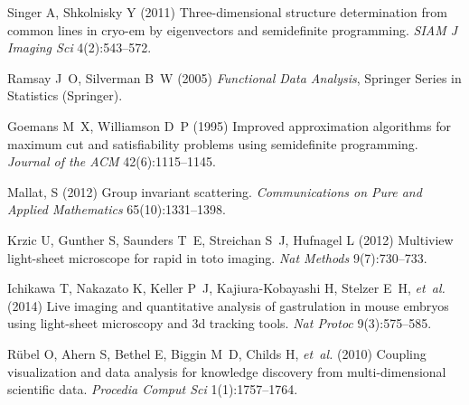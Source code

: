 \documentclass{pnastwo}
\begin{document}
\begin{article}
\begin{thebibliography}{10}
Singer A, Shkolnisky Y (2011) Three-dimensional structure determination from
  common lines in cryo-em by eigenvectors and semidefinite programming.
  \textit{SIAM J Imaging Sci} 4(2):543--572.

Ramsay J~O, Silverman B~W (2005) \textit{Functional Data Analysis}, Springer
  Series in Statistics (Springer).

Goemans M~X, Williamson D~P (1995) Improved approximation algorithms for maximum cut and satisfiability problems using semidefinite programming.
\textit{Journal of the ACM} 42(6):1115--1145.

Mallat, S (2012) Group invariant scattering. 
\textit{Communications on Pure and Applied Mathematics}
65(10):1331--1398.

Krzic U, Gunther S, Saunders T~E, Streichan S~J, Hufnagel L (2012) Multiview
  light-sheet microscope for rapid in toto imaging. \textit{Nat Methods}
  9(7):730--733.

Ichikawa T, Nakazato K, Keller P~J, Kajiura-Kobayashi H, Stelzer E~H,
  \textit{et~al.} (2014) Live imaging and quantitative analysis of gastrulation
  in mouse embryos using light-sheet microscopy and 3d tracking tools.
  \textit{Nat Protoc} 9(3):575--585.

R{\"u}bel O, Ahern S, Bethel E, Biggin M~D, Childs H, \textit{et~al.} (2010)
  Coupling visualization and data analysis for knowledge discovery from
  multi-dimensional scientific data. \textit{Procedia Comput Sci}
  1(1):1757--1764.

\end{thebibliography}



\end{article}
\end{document}
